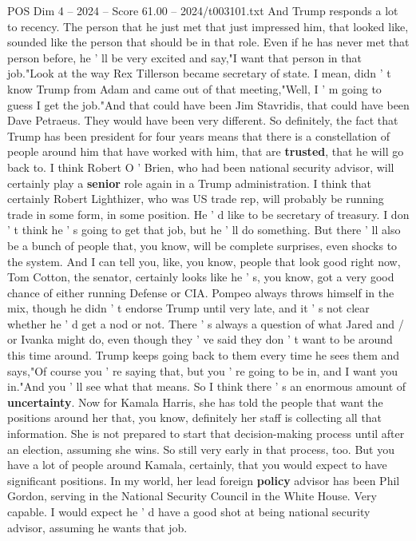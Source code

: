 \begin{textsample}{POS Dim 4 – 2024 – Score 61.00 – 2024/t003101.txt}
And Trump responds a lot to recency.
The person that he just met that just impressed him, that looked like, sounded like the person that should be in that role.
Even if he has never met that person before, he ' ll be very excited and say,"I want that person in that job."Look at the way Rex Tillerson became secretary of state.
I mean, didn ' t know Trump from Adam and came out of that meeting,"Well, I ' m going to guess I get the job."And that could have been Jim Stavridis, that could have been Dave Petraeus.
They would have been very different.
So definitely, the fact that Trump has been president for four years means that there is a constellation of people around him that have worked with him, that are \textbf{trusted}, that he will go back to.
I think Robert O ' Brien, who had been national security advisor, will certainly play a \textbf{senior} role again in a Trump administration.
I think that certainly Robert Lighthizer, who was US trade rep, will probably be running trade in some form, in some position.
He ' d like to be secretary of treasury.
I don ' t think he ' s going to get that job, but he ' ll do something.
But there ' ll also be a bunch of people that, you know, will be complete surprises, even shocks to the system.
And I can tell you, like, you know, people that look good right now, Tom Cotton, the senator, certainly looks like he ' s, you know, got a very good chance of either running Defense or CIA.
Pompeo always throws himself in the mix, though he didn ' t endorse Trump until very late, and it ' s not clear whether he ' d get a nod or not.
There ' s always a question of what Jared and / or Ivanka might do, even though they ' ve said they don ' t want to be around this time around.
Trump keeps going back to them every time he sees them and says,"Of course you ' re saying that, but you ' re going to be in, and I want you in."And you ' ll see what that means.
So I think there ' s an enormous amount of \textbf{uncertainty}.
Now for Kamala Harris, she has told the people that want the positions around her that, you know, definitely her staff is collecting all that information.
She is not prepared to start that decision-making process until after an election, assuming she wins.
So still very early in that process, too.
But you have a lot of people around Kamala, certainly, that you would expect to have significant positions.
In my world, her lead foreign \textbf{policy} advisor has been Phil Gordon, serving in the National Security Council in the White House.
Very capable.
I would expect he ' d have a good shot at being national security advisor, assuming he wants that job.

\end{textsample}

